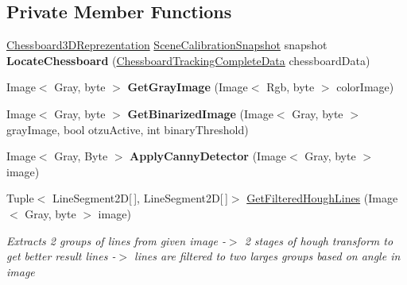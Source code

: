 \subsection*{Private Member Functions}
\begin{DoxyCompactItemize}
\item 
\mbox{\label{class_chess_tracking_1_1_image_processing_1_1_chessboard_algorithms_1_1_chessboard_localization_algorithm_aae2302d719b64f2cdff165628f084295}} 
\mbox{\hyperlink{class_chess_tracking_1_1_image_processing_1_1_chessboard_algorithms_1_1_chessboard3_d_reprezentation}{Chessboard3\+D\+Reprezentation}} \mbox{\hyperlink{class_chess_tracking_1_1_image_processing_1_1_pipeline_data_1_1_scene_calibration_snapshot}{Scene\+Calibration\+Snapshot}} snapshot {\bfseries Locate\+Chessboard} (\mbox{\hyperlink{class_chess_tracking_1_1_image_processing_1_1_pipeline_data_1_1_chessboard_tracking_complete_data}{Chessboard\+Tracking\+Complete\+Data}} chessboard\+Data)
\item 
\mbox{\label{class_chess_tracking_1_1_image_processing_1_1_chessboard_algorithms_1_1_chessboard_localization_algorithm_adfd7894494f97d6d3d5f4217dcf25083}} 
Image$<$ Gray, byte $>$ {\bfseries Get\+Gray\+Image} (Image$<$ Rgb, byte $>$ color\+Image)
\item 
\mbox{\label{class_chess_tracking_1_1_image_processing_1_1_chessboard_algorithms_1_1_chessboard_localization_algorithm_a10659addfcae6fb95a576cf0eee7f366}} 
Image$<$ Gray, byte $>$ {\bfseries Get\+Binarized\+Image} (Image$<$ Gray, byte $>$ gray\+Image, bool otzu\+Active, int binary\+Threshold)
\item 
\mbox{\label{class_chess_tracking_1_1_image_processing_1_1_chessboard_algorithms_1_1_chessboard_localization_algorithm_aa2313fc34d343a035c4eb97f155e3155}} 
Image$<$ Gray, Byte $>$ {\bfseries Apply\+Canny\+Detector} (Image$<$ Gray, byte $>$ image)
\item 
Tuple$<$ Line\+Segment2D\mbox{[}$\,$\mbox{]}, Line\+Segment2D\mbox{[}$\,$\mbox{]}$>$ \mbox{\hyperlink{class_chess_tracking_1_1_image_processing_1_1_chessboard_algorithms_1_1_chessboard_localization_algorithm_a9b732ea43a2ee35d0ae78678243057db}{Get\+Filtered\+Hough\+Lines}} (Image$<$ Gray, byte $>$ image)
\begin{DoxyCompactList}\small\item\em Extracts 2 groups of lines from given image -\/$>$ 2 stages of hough transform to get better result lines -\/$>$ lines are filtered to two larges groups based on angle in image \end{DoxyCompactList}\end{DoxyCompactItemize}

